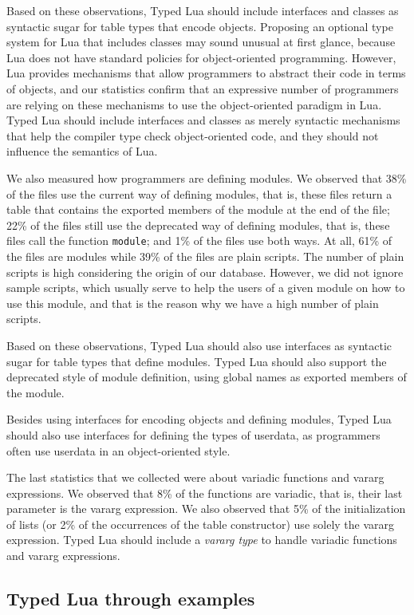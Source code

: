 \documentclass[preprint]{sig-alternate}
\begin{document}
Based on these observations, Typed Lua should include interfaces and
classes as syntactic sugar for table types that encode objects.
Proposing an optional type system for Lua that includes classes may
sound unusual at first glance, because Lua does not have standard
policies for object-oriented programming.
However, Lua provides mechanisms that allow programmers to abstract
their code in terms of objects, and our statistics confirm that
an expressive number of programmers are relying on these mechanisms to
use the object-oriented paradigm in Lua.
Typed Lua should include interfaces and classes as merely syntactic
mechanisms that help the compiler type check object-oriented code,
and they should not influence the semantics of Lua.

We also measured how programmers are defining modules.
We observed that 38\% of the files use the current way of defining
modules, that is, these files return a table that contains the
exported members of the module at the end of the file;
22\% of the files still use the deprecated way of defining modules,
that is, these files call the function \texttt{module};
and 1\% of the files use both ways.
At all, 61\% of the files are modules while 39\% of the files are
plain scripts.
The number of plain scripts is high considering the origin of
our database.
However, we did not ignore sample scripts, which usually serve to
help the users of a given module on how to use this module, and
that is the reason why we have a high number of plain scripts.

Based on these observations, Typed Lua should also use interfaces as
syntactic sugar for table types that define modules.
Typed Lua should also support the deprecated style of module
definition, using global names as exported members of the module.

Besides using interfaces for encoding objects and defining modules,
Typed Lua should also use interfaces for defining the types of
userdata, as programmers often use userdata in an object-oriented
style.

The last statistics that we collected were about variadic functions
and vararg expressions.
We observed that 8\% of the functions are variadic, that is,
their last parameter is the vararg expression.
We also observed that 5\% of the initialization of lists
(or 2\% of the occurrences of the table constructor) use solely the
vararg expression.
Typed Lua should include a \textit{vararg type} to handle variadic
functions and vararg expressions.

\subsection{Typed Lua through examples}
\end{document}

